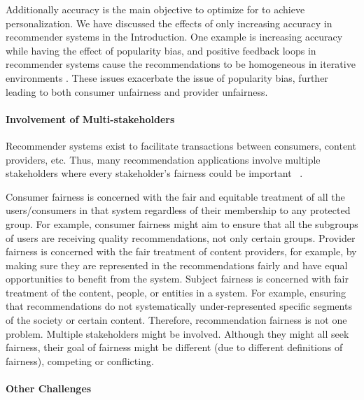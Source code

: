             Additionally accuracy is the main objective to optimize for to achieve personalization. We have discussed the effects of only increasing accuracy in recommender systems in the Introduction. One example is increasing accuracy while having the effect of popularity bias, and positive feedback loops in recommender systems cause the recommendations to be homogeneous in iterative environments \cite{Chaney2018}. These issues exacerbate the issue of popularity bias, further leading to both consumer unfairness and provider unfairness.

        \vspace{0.25cm}
        \noindent \paragraph{Involvement of Multi-stakeholders}
        \vspace{0.25cm}
        
            Recommender systems exist to facilitate transactions between consumers, content providers, etc. Thus, many recommendation applications involve multiple stakeholders where every stakeholder's fairness could be important ~\cite{burke_multisided_2017}.
            
            Consumer fairness is concerned with the fair and equitable treatment of all the users/consumers in that system regardless of their membership to any protected group. For example, consumer fairness might aim to ensure that all the subgroups of users are receiving quality recommendations, not only certain groups. Provider fairness is concerned with the fair treatment of content providers, for example, by making sure they are represented in the recommendations fairly and have equal opportunities to benefit from the system. Subject fairness is concerned with fair treatment of the content, people, or entities in a system. For example, ensuring that recommendations do not systematically under-represented specific segments of the society or certain content. Therefore, recommendation fairness is not one problem. Multiple stakeholders might be involved. Although they might all seek fairness, their goal of fairness might be different (due to different definitions of fairness), competing or conflicting.
            
        \vspace{0.25cm}
        \noindent \paragraph{Other Challenges}
        \vspace{0.25cm}
        
